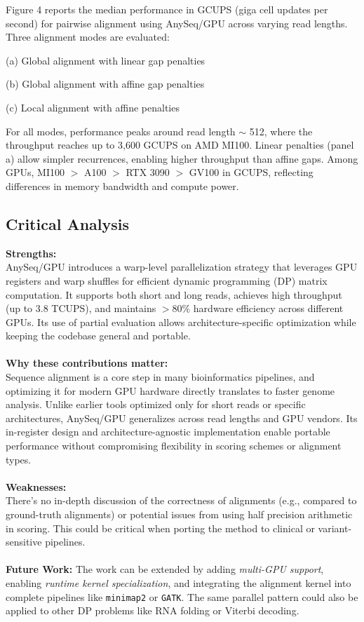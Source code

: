 \documentclass{article}
\begin{document}
Figure 4 reports the median performance in GCUPS (giga cell updates per second) for pairwise alignment using AnySeq/GPU across varying read lengths. Three alignment modes are evaluated:

    (a) Global alignment with linear gap penalties

    (b) Global alignment with affine gap penalties

    (c) Local alignment with affine penalties

For all modes, performance peaks around read length $\sim$ 512, where the throughput reaches up to 3,600 GCUPS on AMD MI100. Linear penalties (panel a) allow simpler recurrences, enabling higher throughput than affine gaps. Among GPUs, MI100 $>$ A100 $>$ RTX 3090 $>$ GV100 in GCUPS, reflecting differences in memory bandwidth and compute power.

\subsection*{Critical Analysis}

\textbf{Strengths:} \\
AnySeq/GPU introduces a warp-level parallelization strategy that leverages GPU registers and warp shuffles for efficient dynamic programming (DP) matrix computation. It supports both short and long reads, achieves high throughput (up to 3.8 TCUPS), and maintains $>$80\% hardware efficiency across different GPUs. Its use of partial evaluation allows architecture-specific optimization while keeping the codebase general and portable. \\ \\
\textbf{Why these contributions matter:} \\
Sequence alignment is a core step in many bioinformatics pipelines, and optimizing it for modern GPU hardware directly translates to faster genome analysis. Unlike earlier tools optimized only for short reads or specific architectures, AnySeq/GPU generalizes across read lengths and GPU vendors. Its in-register design and architecture-agnostic implementation enable portable performance without compromising flexibility in scoring schemes or alignment types. \\ \\
\textbf{Weaknesses:} \\
There’s no in-depth discussion of the correctness of alignments (e.g., compared to ground-truth alignments) or potential issues from using half precision arithmetic in scoring. This could be critical when porting the method to clinical or variant-sensitive pipelines. \\ \\ 
\textbf{Future Work:} 
The work can be extended by adding \textit{multi-GPU support}, enabling \textit{runtime kernel specialization}, and integrating the alignment kernel into complete pipelines like \texttt{minimap2} or \texttt{GATK}. The same parallel pattern could also be applied to other DP problems like RNA folding or Viterbi decoding.
\end{document}
